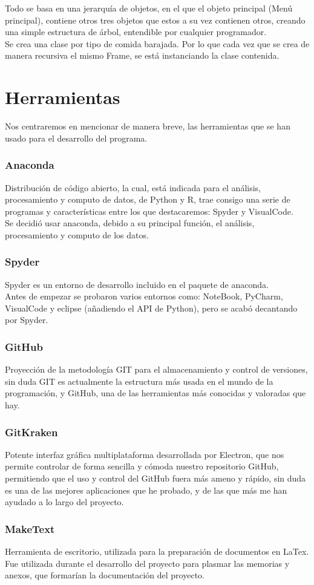 Todo se basa en una  jerarquía de objetos, en el que el objeto principal (Menú principal), contiene otros tres objetos que estos a su vez contienen otros, creando una simple estructura de árbol, entendible por cualquier programador. \\

Se crea una clase por tipo de comida barajada. Por lo que cada vez que se crea de manera recursiva el mismo Frame, se está instanciando la clase contenida.

\section{Herramientas}
 Nos centraremos en mencionar de manera breve, las herramientas que se han usado para el desarrollo del programa.
\subsubsection{Anaconda}
Distribución de código abierto, la cual, está indicada para el análisis, procesamiento y computo de datos, de Python y R, trae consigo una serie de programas y características entre los que destacaremos: Spyder y VisualCode.\\

Se decidió usar anaconda, debido a su principal función, el análisis, procesamiento y computo de los datos.
\subsubsection{Spyder}
Spyder es un entorno de desarrollo incluido en el paquete de anaconda.\\

Antes de empezar se probaron varios entornos como: NoteBook, PyCharm, VisualCode y eclipse (añadiendo el API de Python), pero se acabó decantando por Spyder.\\

\subsubsection{GitHub}
Proyección de la metodología GIT para el almacenamiento y control de versiones, sin duda GIT es actualmente la estructura más usada en el mundo de la programación, y GitHub, una de las herramientas más conocidas y valoradas que hay.
\subsubsection{GitKraken}
Potente interfaz gráfica multiplataforma desarrollada por Electron, que nos permite controlar de forma sencilla y cómoda nuestro repositorio GitHub, permitiendo que el uso y control del GitHub fuera más ameno y rápido, sin duda es una de las mejores aplicaciones que he probado, y de las que más me han ayudado a lo largo del proyecto.
\subsubsection{MakeText}
Herramienta de escritorio, utilizada para la preparación de documentos en LaTex. Fue utilizada durante el desarrollo del proyecto para plasmar las memorias y anexos, que formarían la documentación del proyecto.